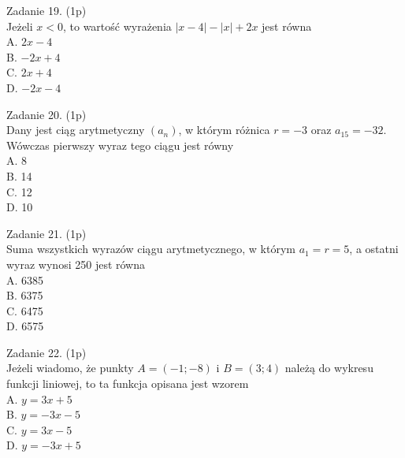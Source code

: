 \documentclass[10pt]{article}
\begin{document}
Zadanie 19. (1p)\\
Jeżeli \(x<0\), to wartość wyrażenia \(|x-4|-|x|+2 x\) jest równa\\
A. \(2 x-4\)\\
B. \(-2 x+4\)\\
C. \(2 x+4\)\\
D. \(-2 x-4\)

Zadanie 20. (1p)\\
Dany jest ciąg arytmetyczny \(\left(a_{n}\right)\), w którym różnica \(r=-3\) oraz \(a_{15}=-32\). Wówczas pierwszy wyraz tego ciągu jest równy\\
A. 8\\
B. 14\\
C. 12\\
D. 10

Zadanie 21. (1p)\\
Suma wszystkich wyrazów ciągu arytmetycznego, w którym \(a_{1}=r=5\), a ostatni wyraz wynosi 250 jest równa\\
A. 6385\\
B. 6375\\
C. 6475\\
D. 6575

Zadanie 22. (1p)\\
Jeżeli wiadomo, że punkty \(A=(-1 ;-8)\) i \(B=(3 ; 4)\) należą do wykresu funkcji liniowej, to ta funkcja opisana jest wzorem\\
A. \(y=3 x+5\)\\
B. \(y=-3 x-5\)\\
C. \(y=3 x-5\)\\
D. \(y=-3 x+5\)
\end{document}
